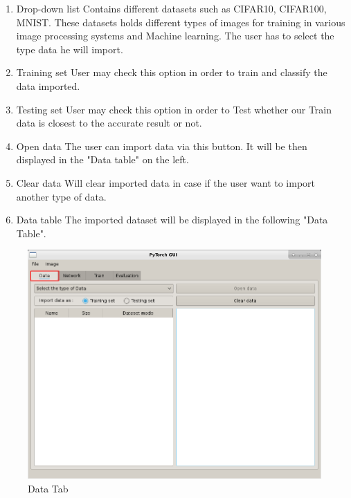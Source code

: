 \begin{enumerate}
    \item Drop-down list \newline
        Contains different datasets such as CIFAR10, CIFAR100, MNIST. These datasets holds different types of images for training in various image processing systems and Machine learning.
        The user has to select the type data he will import.
    \item Training set \newline
        User may check this option in order to train and classify the data imported.
    \item Testing set \newline
        User may check this option in order to Test whether our Train data is closest to the accurate result or not.
    \item Open data \newline 
        The user can import data via this button. It will be then displayed in the "Data table" on the left.
    \item Clear data \newline
        Will clear imported data in case if the user want to import another type of data.
    \item Data table \newline
        The imported dataset will be displayed in the following "Data Table". 
\end{enumerate}

\begin{figure}[h!]
    \centering 
    \includegraphics[scale=0.4]{figures/app_screen_shoots/Data_tab.png}
    \caption{Data Tab}
\end{figure}



